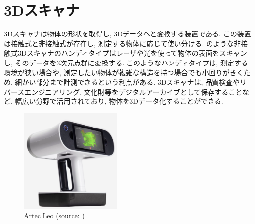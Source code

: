 \section{3Dスキャナ}
3Dスキャナは物体の形状を取得し, 3Dデータへと変換する装置である.
この装置は接触式と非接触式が存在し, 測定する物体に応じて使い分ける.
のような非接触式3Dスキャナのハンディタイプはレーザや光を使って物体の表面をスキャンし, そのデータを3次元点群に変換する.
このようなハンディタイプは, 測定する環境が狭い場合や, 測定したい物体が複雑な構造を持つ場合でも小回りがきくため, 細かい部分まで計測できるという利点がある.
3Dスキャナは, 品質検査やリバースエンジニアリング, 文化財等をデジタルアーカイブとして保存することなど, 幅広い分野で活用されており, 物体を3Dデータ化することができる.

\vspace{5mm}
\begin{figure}[H]
     \centering
     \includegraphics[width=50mm]{images/png/artecleo.png}
     \caption{Artec Leo (source: \cite{artecleo})}
     \label{Fig:artecleo}
   \end{figure}